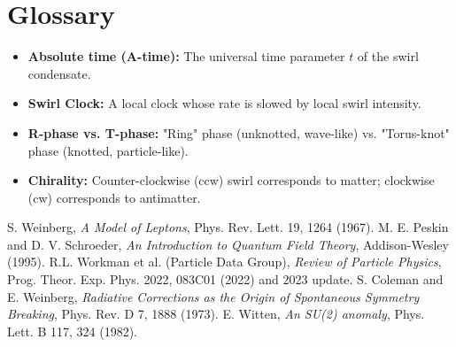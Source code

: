 \documentclass[11pt]{article}
\begin{document}
\section{Glossary}
\begin{itemize}
\item \textbf{Absolute time (A-time):} The universal time parameter $t$ of the swirl condensate.
\item \textbf{Swirl Clock:} A local clock whose rate is slowed by local swirl intensity.
\item \textbf{R-phase vs. T-phase:} "Ring" phase (unknotted, wave-like) vs. "Torus-knot" phase (knotted, particle-like).
\item \textbf{Chirality:} Counter-clockwise (ccw) swirl corresponds to matter; clockwise (cw) corresponds to antimatter.
\end{itemize}

\begin{thebibliography}{9}
 S. Weinberg, \emph{A Model of Leptons}, Phys. Rev. Lett. 19, 1264 (1967).
 M. E. Peskin and D. V. Schroeder, \emph{An Introduction to Quantum Field Theory}, Addison-Wesley (1995).
 R.L. Workman et al. (Particle Data Group), \emph{Review of Particle Physics}, Prog. Theor. Exp. Phys. 2022, 083C01 (2022) and 2023 update.
 S. Coleman and E. Weinberg, \emph{Radiative Corrections as the Origin of Spontaneous Symmetry Breaking}, Phys. Rev. D 7, 1888 (1973).
 E. Witten, \emph{An SU(2) anomaly}, Phys. Lett. B 117, 324 (1982).
\end{thebibliography}
\end{document}
